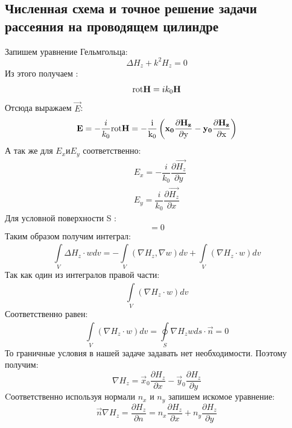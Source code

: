 \subsection{Численная схема и точное решение задачи рассеяния на проводящем цилиндре}
Запишем уравнение Гельмгольца:
\begin{equation}
\Delta H_{z} + k^2H_{z} = 0
\end{equation}
Из этого получаем : 
\begin{equation}
{\rm rot}\vec{H} = i k_{0}\vec{H}
\end{equation}
Отсюда выражаем  $\vec{E}$:
\begin{equation}
	\vec{E} = - \dfrac{i}{k_{0}} \rm rot\vec{H} = - \dfrac{i}{k_{0}} \left(\vec{x_{0}}\dfrac{\partial \vec{H_{z}}}{\partial y} - \vec{y_{0}}\dfrac{\partial \vec{H_{z}}}{\partial x}\right)
\end{equation}
А так же для $ E_{x} и E_{y} $ соответственно:
\begin{align}
	&E_{x} = - 
	\dfrac{i}{k_{0}}
	\dfrac{\partial\vec{H_{z}}}{\partial y} \\
	&E_{y} = \dfrac{i}{k_{0}}
	\dfrac{\partial\vec{H_{z}}}{\partial x}
\end{align}
Для условной поверхности S : \\
\begin{equation}
[\vec{n}, \vec{x_{0}}E_{x} + \vec{y_{0}}E_{y}] = 0
\end{equation}
Таким образом получим интеграл:
\begin{equation}
	\int\limits_{V}^{} \Delta H_{z} \cdot wdv = - \int\limits_{V}^{}(\nabla H_{z}, \nabla w)dv +  \int\limits_{V}^{}(\nabla H_{z} \cdot w)dv
\end{equation}
Так как один из интегралов правой части: 
\begin{equation}
	\int\limits_{V}^{}(\nabla H_{z} \cdot w)dv
\end{equation}
Соответственно равен: 
\begin{equation}
	\int\limits_{V}^{}(\nabla H_{z} \cdot w)dv = \oint\limits_{S}^{} \nabla H_{z}  wds \cdot \vec{n} = 0
\end{equation}
То граничные условия в нашей задаче задавать нет необходимости.
Поэтому получим:
\begin{equation}
	\nabla H_{z} = \vec{x}_{0} \dfrac{\partial H_{z}}{\partial x} - \vec{y}_{0}
	\dfrac{\partial H_{z}}{\partial y}
\end{equation}
Cоответственно используя нормали $n_{x}$ и $n_{y}$  запишем искомое уравнение:
\begin{equation}
	\vec{n}\nabla H_{z} = \dfrac{\partial H_{z}}{\partial n} = 
	n_{x}\dfrac{\partial H_{z}}{\partial x} +
	n_{y}\dfrac{\partial H_{z}}{\partial y}
\end{equation}
